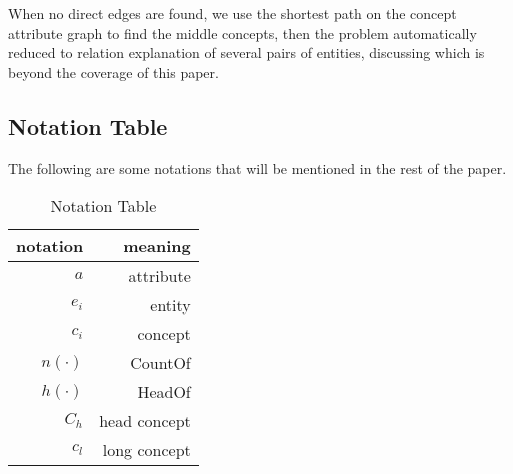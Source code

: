 When no direct edges are found, we use the shortest path on the concept attribute graph to find the middle concepts, then the problem automatically reduced to relation explanation of several pairs of entities, discussing which is beyond the coverage of this paper.





\subsection{Notation Table}
The following are some notations that will be mentioned in the rest of the paper.
\begin{table}[htbp]
  \centering
  \caption{Notation Table}
    \begin{tabular}{rr}
    \toprule
    notation & meaning \\
    \midrule
    $a$     & attribute \\
    $e_i$  & entity \\
    $c_i$  & concept \\
    $n(\cdot)$  & CountOf \\
    $h(\cdot)$ & HeadOf \\
    $C_h$  & head concept \\
    $c_l$  & long concept \\
    \bottomrule
    \end{tabular}%
  \label{tab:notation}%
\end{table}%


